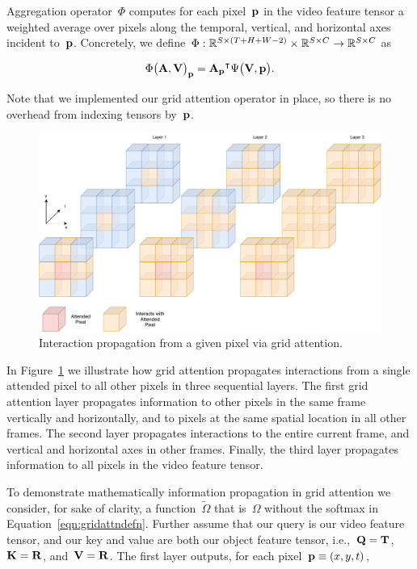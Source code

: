 Aggregation operator~$\Phi$ computes for each pixel~$\mathbf{p}{}$ in the video
feature tensor a weighted average over pixels along the temporal, vertical, and
horizontal axes incident to~$\mathbf{p}{}$.
Concretely, we
define~$\Phi : \mathbb{R}{}^{S\times (T + H + W - 2)} \times \mathbb{R}{}^{S\times C} \rightarrow \mathbb{R}{}^{S\times C}$
as

\begin{equation}
        {\Phi\big(\mathbf{A}, \mathbf{V}{}\big)}_{\mathbf{p}}{} =  {\mathbf{A}_{\mathbf{p}}{}}^\intercal \Psi\big(\mathbf{V}{}, \mathbf{p}{}\big).
\end{equation}

Note that we implemented our grid attention operator in place, so there is no
overhead from indexing tensors by~$\mathbf{p}{}$.

\begin{figure}
\centering
\includegraphics[scale=0.25]{Figures/gridattention}
\caption{Interaction propagation from a given pixel via grid attention.}
\label{fig:ainadecoder}
\end{figure}

In Figure~\ref{fig:ainadecoder} we illustrate how grid attention propagates
interactions from a single attended pixel to all other pixels in three
sequential layers.
The first grid attention layer propagates information to other pixels in the
same frame vertically and horizontally, and to pixels at the same spatial
location in all other frames.
The second layer propagates interactions to the entire current frame, and
vertical and horizontal axes in other frames.
Finally, the third layer propagates information to all pixels in the video
feature tensor.

To demonstrate mathematically information propagation in grid attention we
consider, for sake of clarity, a function~$\tilde{\Omega}$ that is~$\Omega$
without the softmax in Equation~\ref{eqn:gridattndefn}.
Further assume that our query is our video feature tensor, and our key and
value are both our object feature tensor,
i.e.,~$\mathbf{Q}{} = \mathbf{T}{}$,~$\mathbf{K}{} = \mathbf{R}{}$,
and~$\mathbf{V}{} = \mathbf{R}{}$.
The first layer outputs, for each pixel~$\mathbf{p}{} \equiv (x, y, t)$,


